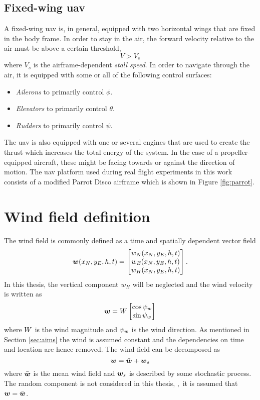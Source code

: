 \subsection{Fixed-wing \ac{uav}}
A fixed-wing \ac{uav} is, in general, equipped with two horizontal wings that are fixed in the body frame.
In order to stay in the air, the forward velocity relative to the air must be above a certain threshold, \ie
\begin{equation}
    V > V_{s}
\end{equation}
where $V_s$ is the airframe-dependent \textit{stall speed}. In order to navigate through the
air, it is equipped with some or all of the following control surfaces:
\begin{itemize}
    \item \textit{Ailerons} to primarily control $\phi$.
    \item \textit{Elevators} to primarily control $\theta$.
    \item \textit{Rudders} to primarily control $\psi$.
\end{itemize}
The \ac{uav} is also equipped with one or several engines that are used to create the thrust which
increases the total energy of the system. In the case of a propeller-equipped aircraft, these might be facing towards or against the direction of motion.
The \ac{uav} platform used during real flight experiments in this work consists of a modified Parrot Disco airframe which is shown in Figure \ref{fig:parrot}.


\section{Wind field definition}
The wind field is commonly defined as a time and spatially dependent vector field \cite{wind_direct_computation}
\begin{equation}
    \boldsymbol{w}(x_N,y_E,h,t)=
    \begin{bmatrix}
        w_N(x_N,y_E,h,t) \\
        w_E(x_N,y_E,h,t) \\
        w_H(x_N,y_E,h,t)
    \end{bmatrix}
    .
\end{equation}
In this thesis, the vertical component $w_H$ will be neglected and the wind velocity is written as 
\begin{equation}
    \boldsymbol{w}=W\begin{bmatrix}
        \cos\psi_w\\
        \sin\psi_w
    \end{bmatrix}
\end{equation}
where $W$ is the wind magnitude and $\psi_w$ is the wind direction. 
As mentioned in Section \ref{sec:aims} the wind is assumed constant and the dependencies on time and location are hence removed.
The wind field can be decomposed as
\begin{equation}
    \boldsymbol{w} = \bar{\boldsymbol{w}} + \boldsymbol{w}_s
\end{equation}
where $\bar{\boldsymbol{w}}$ is the mean wind field and $\boldsymbol{w}_s$ is described by some stochastic process. The random component is not considered in this thesis, 
,\ie\, it is assumed that $\boldsymbol{w}=\bar{\boldsymbol{w}}$.

